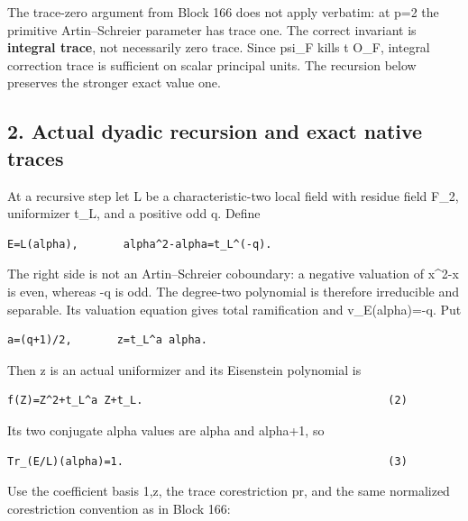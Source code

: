 The trace-zero argument from Block 166 does not apply verbatim: at p=2 the
primitive Artin--Schreier parameter has trace one. The correct invariant
is \textbf{integral trace}, not necessarily zero trace. Since psi\_F
kills t O\_F, integral correction trace is sufficient on scalar
principal units. The recursion below preserves the stronger exact value
one.

\hypertarget{dyadic_character-actual-dyadic-recursion-and-exact-native-traces}{%
\subsection{2. Actual dyadic recursion and exact native
traces}\label{dyadic_character-actual-dyadic-recursion-and-exact-native-traces}}

At a recursive step let L be a characteristic-two local field with
residue field F\_2, uniformizer t\_L, and a positive odd q. Define

\begin{Verbatim}[fontsize=\small,breaklines=true,breakanywhere=true]
E=L(alpha),       alpha^2-alpha=t_L^(-q).
\end{Verbatim}

The right side is not an Artin--Schreier coboundary: a negative
valuation of x\^{}2-x is even, whereas -q is odd. The degree-two
polynomial is therefore irreducible and separable. Its valuation
equation gives total ramification and v\_E(alpha)=-q. Put

\begin{Verbatim}[fontsize=\small,breaklines=true,breakanywhere=true]
a=(q+1)/2,       z=t_L^a alpha.
\end{Verbatim}

Then z is an actual uniformizer and its Eisenstein polynomial is

\begin{Verbatim}[fontsize=\small,breaklines=true,breakanywhere=true]
f(Z)=Z^2+t_L^a Z+t_L.                                      (2)
\end{Verbatim}

Its two conjugate alpha values are alpha and alpha+1, so

\begin{Verbatim}[fontsize=\small,breaklines=true,breakanywhere=true]
Tr_(E/L)(alpha)=1.                                         (3)
\end{Verbatim}

Use the coefficient basis 1,z, the trace corestriction pr, and the same
normalized corestriction convention as in Block 166:

